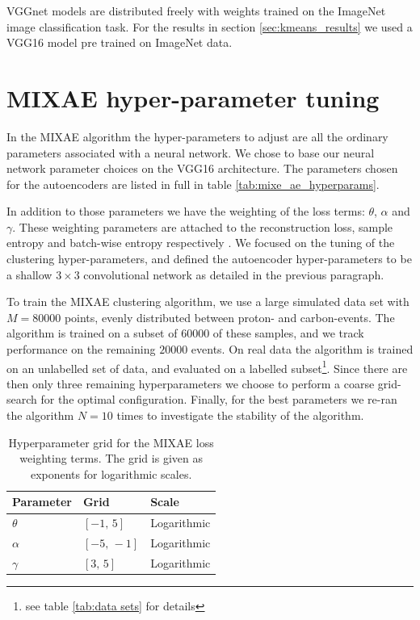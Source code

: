 \documentclass[review,sort&compress]{elsarticle}
\begin{document}
VGGnet models are distributed freely with weights trained on the ImageNet \cite{deng2009imagenet} image classification task. For the results in section \ref{sec:kmeans_results} we used a VGG16 model pre trained on ImageNet data.

\section{MIXAE hyper-parameter tuning}\label{ax: mixae}

In the MIXAE algorithm the hyper-parameters to adjust are all the ordinary parameters associated with a neural network. We chose to base our neural network parameter choices on the VGG16 architecture. 
The parameters chosen for the autoencoders are listed in full in table \ref{tab:mixe_ae_hyperparams}.

In addition to those parameters we have the weighting of the loss terms: $\theta$, $\alpha$ and $\gamma$. These weighting parameters are attached to the reconstruction loss, sample entropy and batch-wise entropy respectively \cite{Zhang}. 
We focused on the tuning of the clustering hyper-parameters, and defined the autoencoder hyper-parameters to be a shallow $3\times3$ convolutional network as detailed in the previous paragraph.  

To train the MIXAE clustering algorithm, we use a large simulated data set with $M=80000$ points, evenly distributed between proton- and carbon-events. The algorithm is trained on a subset of $60000$ of these samples, and we track performance on the remaining $20000$ events. On real data the algorithm is trained on an unlabelled set of data, and evaluated on a labelled subset\footnote{see table \ref{tab:data sets} for details}. Since there are then only three remaining hyperparameters we choose to perform a coarse grid-search for the optimal configuration. Finally, for the best parameters we re-ran the algorithm $N=10$ times to investigate the stability of the algorithm.

\begin{table}
\centering
\caption{Hyperparameter grid for the MIXAE loss weighting terms. The grid is given as exponents for logarithmic scales.}\label{tab:mixae_loss_weights}
\begin{tabular}{lll}
\toprule
Parameter & Grid & Scale \\
\midrule 
$\theta$ & $[-1,\, 5]$ & Logarithmic \\
$\alpha$ & $[-5,\, -1]$ & Logarithmic \\
$\gamma$ & $[3,\, 5]$ & Logarithmic
\end{tabular}
\end{table}
\end{document}
